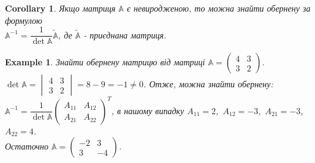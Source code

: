 \documentclass[a4paper, 10pt]{article}
\theoremstyle{theoremdd}
\newtheorem{example}[theorem]{Example}
\newtheorem{corollary}[theorem]{Corollary}
\begin{document}
\begin{corollary}
Якщо матриця $\mathbb{A}$ є невиродженою, то можна знайти обернену за формулою \\ $\mathbb{A}^{-1} = \dfrac{1}{\det \mathbb{A}} \tilde{\mathbb{A}}$, де $\tilde{\mathbb{A}}$ - приєднана матриця.
\end{corollary}

\begin{example}
Знайти обернену матрицю від матриці $\mathbb{A} = \begin{pmatrix}
4 & 3 \\
3 & 2
\end{pmatrix}$.\\
$\det \mathbb{A} = \begin{vmatrix}
4 & 3 \\
3 & 2
\end{vmatrix} = 8-9 = -1 \neq 0$. Отже, можна знайти обернену:\\
$\mathbb{A}^{-1} = \dfrac{1}{\det \mathbb{A}} \begin{pmatrix}
A_{11} & A_{12} \\
A_{21} & A_{22}
\end{pmatrix}^T$, в нашому випадку $A_{11} = 2$,\ $A_{12} = -3$,\ $A_{21} = -3$,\ $A_{22}=4$.\\
Остаточно $\mathbb{A} = \begin{pmatrix}
-2 & 3 \\
3 & -4
\end{pmatrix}$.
\end{example}
\end{document}

